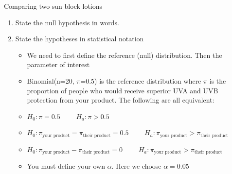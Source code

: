 \documentclass{beamer}\usepackage[]{graphicx}\usepackage[]{color}
\begin{document}
\begin{frame}[fragile]{Comparing two sun block lotions}
\small
\begin{enumerate}
	\setlength\itemsep{1em}
	\item State the null hypothesis in words. \pause
	\item State the hypotheses in statistical notation \pause
	\begin{itemize}
			\setlength\itemsep{.71em}
		\item We need to first define the reference (null) distribution. Then the parameter of interest \pause
		\item Binomial(n=20, $\pi$=0.5) is the reference distribution where $\pi$ is the proportion of people who would receive superior UVA and UVB protection from your product. \pause
		The following are all equivalent: 
		\item[] $H_0: \pi = 0.5 \qquad$ $H_a: \pi > 0.5$ \pause
		\item[] $H_0: \pi_{\textrm{your product}}=\pi_{\textrm{their product}} = 0.5 \qquad$ $H_a: \pi_{\textrm{your product}} > \pi_{\textrm{their product}}$ \pause
		\item[] $H_0: \pi_{\textrm{your product}}-\pi_{\textrm{their product}} = 0 \qquad$ $H_a: \pi_{\textrm{your product}} > \pi_{\textrm{their product}}$ \pause
		\item You must define your own $\alpha$. Here we choose $\alpha=0.05$ 		
	\end{itemize}
      
 
\end{enumerate}

\end{frame}
\end{document}
